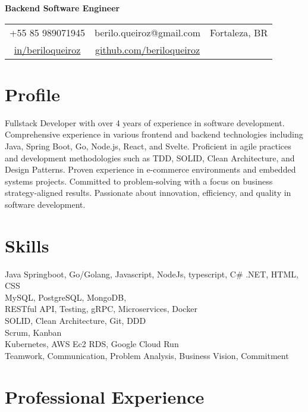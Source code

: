\documentclass[11pt,a4paper,sans]{moderncv}
\begin{document}
\makecvtitle
\vspace*{-16mm}
\begin{center}\textbf{Backend Software Engineer}\end{center}
\begin{center}
	\begin{tabular}{ c c c }
		\faMobile\enspace +55 85 989071945                                                                  & \enspace berilo.queiroz@gmail.com & \enspace\faHome\enspace Fortaleza, BR \\
		\faLinkedin\enspace \color{blue} \href{https://www.linkedin.com/in/beriloqueiroz}{in/beriloqueiroz} &
		\faGithub\enspace \color{blue} \href{https://github.com/beriloqueiroz}{github.com/beriloqueiroz}    & \enspace
	\end{tabular}
\end{center}

\section{Profile}
 {
  Fullstack Developer with over 4 years of experience in software development. Comprehensive experience in various frontend and backend technologies including Java, Spring Boot, Go, Node.js, React, and Svelte. Proficient in agile practices and development methodologies such as TDD, SOLID, Clean Architecture, and Design Patterns. Proven experience in e-commerce environments and embedded systems projects. Committed to problem-solving with a focus on business strategy-aligned results. Passionate about innovation, efficiency, and quality in software development.
 }

\section{Skills}
 {
  Java Springboot, Go/Golang, Javascript, NodeJs, typescript, C\# .NET, HTML, CSS \\
  MySQL, PostgreSQL, MongoDB, \\
  RESTful API, Testing, gRPC, Microservices, Docker\\
  SOLID, Clean Architecture, Git, DDD \\
  Scrum, Kanban\\
  Kubernetes, AWS Ec2 RDS, Google Cloud Run\\
  Teamwork, Communication, Problem Analysis, Business Vision, Commitment\\
 }

\section{Professional Experience}
\end{document}
